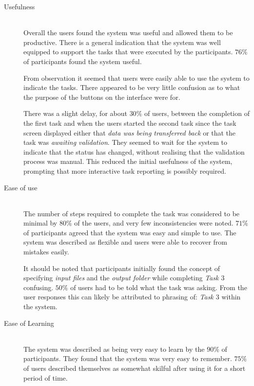 \documentclass[12pt,a4paper]{report}
\begin{document}
\begin{description}
    \item[Usefulness] \hfill \\
    	Overall the users found the system was useful and allowed them to be
    	productive. There is a general indication that the system was well
    	equipped to support the tasks that were executed by the participants.
	$76\%$ of participants found the system useful.

    	From observation it seemed that users were easily able to use the system
    	to indicate the tasks. There appeared to be very little confusion as to
    	what the purpose of the buttons on the interface were for. 

    	There was a slight delay, for about $30\%$ of users, between the
	completion of the first task and 
    	when the users started the second task since the task screen displayed
    	either that \emph{data was being transferred back} or that the task
    	was \emph{awaiting validation}. They seemed to wait for the system to
    	indicate that the status has changed, without realising that the
    	validation process was manual. This reduced the initial usefulness of
    	the system, prompting that more interactive task reporting is possibly
    	required.
    \item[Ease of use] \hfill \\
    	The number of steps required to complete the task was considered to be
    	minimal by $80\%$ of the users, and very few inconsistencies were 
	noted. $71\%$ of participants agreed that the system was easy
	and simple to
    	use. The system was described as flexible and users were able to
    	recover from mistakes easily.

    	It should be noted that participants initially found the concept of
    	specifying \emph{input files} and the \emph{output folder} while
    	completing \emph{Task $3$} confusing. $50\%$ of users had to be told
    	what the task was asking. From the user responses this can likely be
    	attributed to phrasing of: \emph{Task $3$} within the system.

    \item[Ease of Learning] \hfill \\
        The system was described as being very easy to learn by the $90\%$ of
    	participants. They found that the system was very easy to remember.
    	$75\%$ of users described themselves as somewhat skilful after using
	it for a short	period of time.


\end{description}
\end{document}

